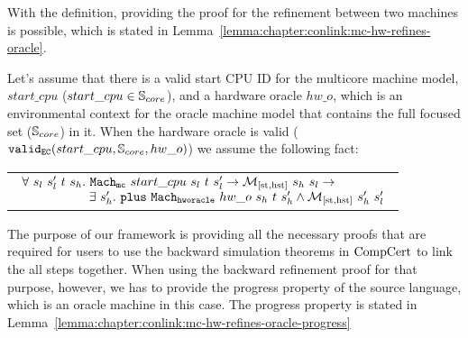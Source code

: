 %
%

With the definition, providing the proof for the refinement between two machines is possible,
which is stated in Lemma~\ref{lemma:chapter:conlink:mc-hw-refines-oracle}.
\begin{lemma}
\label{lemma:chapter:conlink:mc-hw-refines-oracle}
Let's assume that there is a valid start CPU ID for the multicore machine model, 
$start\_cpu$ ($start\_cpu \in {\mathbb{S}_{core}}$), and a hardware oracle $hw\_o$,  
which is an environmental context for the oracle machine model that contains the full focused set (${\mathbb{S}_{core}}$) in it.
When the hardware oracle is valid ($ {{\mathrm{\texttt{valid}}}_{{\mathrm{\texttt{EC}}}}}({start\_cpu}, {{\mathbb{S}_{core}}}, {hw\_o})$) we assume the following fact:
\begin{center}
\begin{tabular}{P{0.95\textwidth}}
$
\begin{array}{l}
\forall \ s_l \ s_l' \ t \ s_h . \ \hardwarestep{start\_cpu}{s_l}{t}{s_l'} \rightarrow  \matchstatehstate{s_h}{s_l} \rightarrow \\
\ \ \ \ \ \ \ \ \ \ \ \ \ \ \ \ \exists\ s_h' . \  \ccplusstep{\oraclestep{hw\_o}{s_h}{t}{s_h'}} \wedge  \matchstatehstate{s_h'}{s_l'}\\
\end{array}
$
\end{tabular}
\end{center}
\end{lemma}

The purpose of our framework is providing all the necessary proofs that are required 
for users to use the backward simulation theorems in $\mathrm{CompCert}$ to link the all steps together. 
When using the backward refinement proof for that purpose, however, we has to provide the progress property of the 
source language, which is an oracle machine in this case. 
The progress property is stated in Lemma~\ref{lemma:chapter:conlink:mc-hw-refines-oracle-progress}

